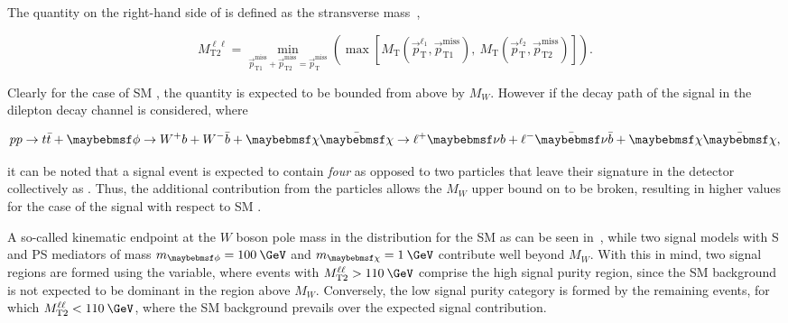 The quantity on the right-hand side of  is defined as the stransverse mass~\cite{Lester:1999tx}, 

\begin{equation}
  M_{\text{T2}}^{\ell\ell} = \min_{\vec{p}^{\text{miss}}_{\text{T1}}+\vec{p}^{\text{miss}}_{\text{T2}}=\vec{p}^{\text{miss}}_{\text{T}}}\left(\max\left[M_{\text{T}}\left(\vec{p}^{\ell_1}_{\text{T}},\vec{p}^{\text{miss}}_{\text{T1}}\right),\:M_{\text{T}}\left(\vec{p}^{\ell_2}_{\text{T}},\vec{p}^{\text{miss}}_{\text{T2}}\right)\right]\right).
  \label{eq:mt2ll_2}
\end{equation}

Clearly for the case of SM \ttll, the \mttll quantity is expected to be bounded from above by $M_W$. However if the decay path of the \ttDM signal in the dilepton decay channel is considered, where

\begin{equation}
pp \rightarrow t\bar{t} + \phi \rightarrow W^{+} b + W^{-} \bar{b} + \XX \rightarrow \ell^{+} \nu b + \ell^{-} \bar{\nu} \bar{b} + \XX,
\end{equation}

it can be noted that a signal event is expected to contain \textit{four} as opposed to two particles that leave their signature in the detector collectively as \MET. Thus, the additional \MET contribution from the \XX particles allows the $M_W$ upper bound on \mttll to be broken, resulting in higher \mttll values for the case of the signal with respect to SM \ttll. 

A so-called kinematic endpoint at the $W$ boson pole mass in the \mttll distribution for the SM \ttll as can be seen in~, while two signal models with S and PS mediators of mass $\mMed=100\:\GeV$ and $\mDM=1\:\GeV$ contribute well beyond $M_W$. With this in mind, two signal regions are formed using the \mttll variable, where events with $\mttll>110\:\GeV$ comprise the high signal purity region, since the SM \ttll background is not expected to be dominant in the region above $M_W$. Conversely, the low signal purity category is formed by the remaining events, for which $\mttll<110\:\GeV$, where the SM \ttll background prevails over the expected signal contribution.

